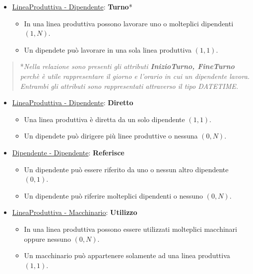 \begin{itemize}
	\item \underline{LineaProduttiva - Dipendente}: \textbf{Turno}*
	
	\begin{itemize}
		\item In una linea produttiva possono lavorare uno o molteplici dipendenti $(1,N)$.
		\item Un dipendete può lavorare in una sola linea produttiva $(1,1)$.
	\end{itemize}
	
\end{itemize}

\begin{verse}
	*\emph{Nella relazione sono presenti gli attributi \textbf{InizioTurno, FineTurno} perchè è utile rappresentare il giorno e l'orario in cui un dipendente lavora. Entrambi gli attributi sono rappresentati attraverso il tipo DATETIME.}
\end{verse}

\begin{itemize}
	\item \underline{LineaProduttiva - Dipendente}: \textbf{Diretto}
	
	\begin{itemize}
		\item Una linea produttiva è diretta da un solo dipendente $(1,1)$.
		\item Un dipendete può dirigere più linee produttive o nessuna $(0,N)$.
	\end{itemize}
	
\end{itemize}

\begin{itemize}
	\item \underline{Dipendente - Dipendente}: \textbf{Referisce}
	
	\begin{itemize}
		\item Un dipendente può essere riferito da uno o nessun altro dipendente $(0,1)$.
		\item Un dipendente può riferire molteplici dipendenti o nessuno $(0,N)$.
	\end{itemize}
	
\end{itemize}

\begin{itemize}
	\item \underline{LineaProduttiva - Macchinario}: \textbf{Utilizzo}
	
	\begin{itemize}
		\item In una linea produttiva possono essere utilizzati molteplici macchinari oppure nessuno $(0,N)$.
		\item Un macchinario può appartenere solamente ad una linea produttiva $(1,1)$.
	\end{itemize}
	
\end{itemize}

